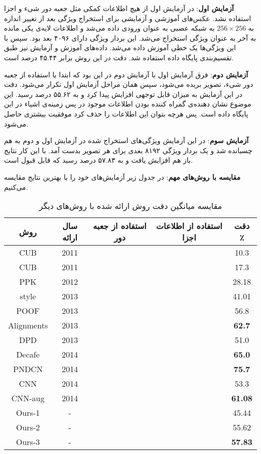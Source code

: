 \documentclass[11pt]{article}
\begin{document}
\textbf{آزمایش اول}:
در آزمایش اول از هیچ اطلاعات کمکی مثل جعبه دور شی‌ء و اجزا استفاده نشد. عکس‌های آموزشی و آزمایشی برای استخراج ویژگی بعد از تغییر اندازه به
$256 \times 256$
به شبکه عصبی به عنوان ورودی داده می‌شد و اطلاعات لایه‌ی یکی مانده به آخر به عنوان ویژگی استخراج می‌شد. این بردار ویژگی دارای ۴۰۹۶ بعد بود. سپس با این ویژگی‌ها یک
 خطی آموزش داده می‌شد.
داده‌های آموزش و آزمایش نیز طبق تقسیم‌بندی پایگاه داده استفاده شد. دقت در این روش برابر ۴۵.۴۴ درصد است.

\textbf{آزمایش دوم}:
فرق آزمایش اول با آزمایش دوم در این بود که ابتدا با استفاده از جعبه دور شیء، تصویر بریده می‌شود، سپس همان مراحل آزمایش اول تکرار می‌شود. دقت در این آزمایش به میزان قابل توجهی افزایش پیدا کرد و به ۵۵.۶۲ درصد رسید. این موضوع نشان دهنده‌ی گمراه کننده بودن اطلاعات موجود در پس زمینه‌ی اشیاء در این پایگاه داده است. پس هرچه بتوان این اطلاعات را حذف کرد موفقیت بیشتری حاصل می‌شود.

\textbf{آزمایش سوم}:
در این آزمایش ویژگی‌های استخراج شده در آزمایش اول و دوم به هم چسبانده شد و یک بردار ویژگی ۸۱۹۲ بعدی برای هر تصویر بدست آمد. با این کار نتایج باز هم افزایش یافت و به ۵۷.۸۳ درصد رسید که قابل قبول است.

\textbf{مقایسه با روش‌های مهم}:
در جدول زیر آزمایش‌های خود را با بهترین نتایج مقایسه‌ می‌کنیم.

\begin{table}
\centering
\caption{مقایسه میانگین دقت روش ارائه شده با روش‌های دیگر}
\label{tbl:result}
\footnotesize{
\begin{tabular}{|c|c|c|c|c|}
\hline روش & سال ارائه & استفاده از جعبه دور & استفاده از اطلاعات اجزا & دقت ٪\\ 
\hline
\hline  	CUB \cite{cub2002011} 	& 2011 & \cmark & 		& 10.3\\
		CUB \cite{cub2002011} 	& 2011 & \cmark & \cmark	& 17.3\\
		PPK \cite{ppk}			& 2012 & \cmark &		& 28.18\\
		style \cite{style_aware}	& 2013 & \cmark &		& 41.01\\
		POOF \cite{poof}		& 2013 & \cmark &		& 56.8 \\
		Alignments \cite{gavves2013}& 2013 & \cmark &		& \textbf{62.7} \\
		DPD \cite{dpd}			& 2013 & \cmark & \cmark	& 51.0 \\
		Decafe \cite{decaf}		& 2014 & \cmark & 		& \textbf{65.0} \\
		PNDCN \cite{partrcnn}	& 2014 & \cmark &		& \textbf{75.7} \\
		CNN \cite{razavian2014}	& 2014 & \cmark &		& 53.3 \\
		CNN-aug \cite{razavian2014} & 2014 & \cmark &		& \textbf{61.08} \\
\hline 	Ours-1				& - 	   &		&		& 45.44 \\
		Ours-2				& -       & \cmark &		& 55.62 \\
		Ours-3				& -       & \cmark &		& \textbf{57.83} \\
\hline 
\end{tabular} 
}
\end{table}
\end{document}
